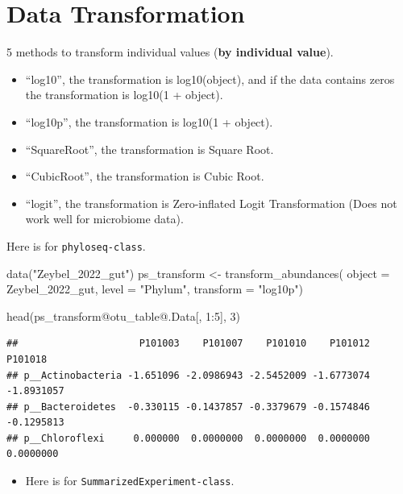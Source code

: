 \documentclass[
]{book}
\newenvironment{Shaded}{\begin{snugshade}}{\end{snugshade}}
\newcommand{\AttributeTok}[1]{\textcolor[rgb]{0.77,0.63,0.00}{#1}}
\newcommand{\DecValTok}[1]{\textcolor[rgb]{0.00,0.00,0.81}{#1}}
\newcommand{\FunctionTok}[1]{\textcolor[rgb]{0.00,0.00,0.00}{#1}}
\newcommand{\NormalTok}[1]{#1}
\newcommand{\OtherTok}[1]{\textcolor[rgb]{0.56,0.35,0.01}{#1}}
\newcommand{\SpecialCharTok}[1]{\textcolor[rgb]{0.00,0.00,0.00}{#1}}
\newcommand{\StringTok}[1]{\textcolor[rgb]{0.31,0.60,0.02}{#1}}
\providecommand{\tightlist}{%
  \setlength{\itemsep}{0pt}\setlength{\parskip}{0pt}}
\begin{document}
\hypertarget{data-transformation}{%
\section{Data Transformation}\label{data-transformation}}

5 methods to transform individual values (\textbf{by individual value}).

\begin{itemize}
\item
  ``log10'', the transformation is log10(object), and if the data contains zeros the transformation is log10(1 + object).
\item
  ``log10p'', the transformation is log10(1 + object).
\item
  ``SquareRoot'', the transformation is Square Root.
\item
  ``CubicRoot'', the transformation is Cubic Root.
\item
  ``logit'', the transformation is Zero-inflated Logit Transformation (Does not work well for microbiome data).
\end{itemize}

Here is for \texttt{phyloseq-class}.

\begin{Shaded}
\begin{Highlighting}[]
\FunctionTok{data}\NormalTok{(}\StringTok{"Zeybel\_2022\_gut"}\NormalTok{)}
\NormalTok{ps\_transform }\OtherTok{\textless{}{-}} \FunctionTok{transform\_abundances}\NormalTok{(}
  \AttributeTok{object =}\NormalTok{ Zeybel\_2022\_gut,}
  \AttributeTok{level =} \StringTok{"Phylum"}\NormalTok{,}
  \AttributeTok{transform =} \StringTok{"log10p"}\NormalTok{)}

\FunctionTok{head}\NormalTok{(ps\_transform}\SpecialCharTok{@}\NormalTok{otu\_table}\SpecialCharTok{@}\NormalTok{.Data[, }\DecValTok{1}\SpecialCharTok{:}\DecValTok{5}\NormalTok{], }\DecValTok{3}\NormalTok{)}
\end{Highlighting}
\end{Shaded}

\begin{verbatim}
##                     P101003    P101007    P101010    P101012    P101018
## p__Actinobacteria -1.651096 -2.0986943 -2.5452009 -1.6773074 -1.8931057
## p__Bacteroidetes  -0.330115 -0.1437857 -0.3379679 -0.1574846 -0.1295813
## p__Chloroflexi     0.000000  0.0000000  0.0000000  0.0000000  0.0000000
\end{verbatim}

\begin{itemize}
\tightlist
\item
  Here is for \texttt{SummarizedExperiment-class}.
\end{itemize}
\end{document}
